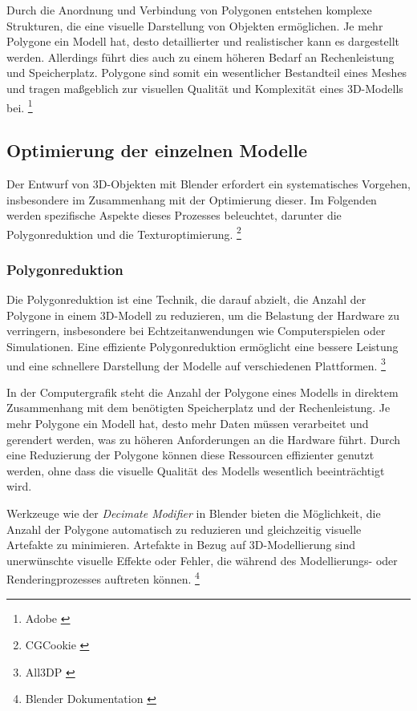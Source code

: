 Durch die Anordnung und Verbindung von Polygonen entstehen komplexe Strukturen, die eine visuelle Darstellung von Objekten ermöglichen. Je mehr Polygone ein Modell hat, desto detaillierter und realistischer kann es dargestellt werden. Allerdings führt dies auch zu einem höheren Bedarf an Rechenleistung und Speicherplatz. Polygone sind somit ein wesentlicher Bestandteil eines Meshes und tragen maßgeblich zur visuellen Qualität und Komplexität eines 3D-Modells bei. \footnote{Adobe \cite{3D Polygon Modeling}}

\subsection{Optimierung der einzelnen Modelle}
Der Entwurf von 3D-Objekten mit Blender erfordert ein systematisches Vorgehen, insbesondere im Zusammenhang mit der Optimierung dieser. Im Folgenden werden spezifische Aspekte dieses Prozesses beleuchtet, darunter die Polygonreduktion und die Texturoptimierung. \footnote{CGCookie \cite{Ways to optimize Game Assets}}

\subsubsection{Polygonreduktion}
Die Polygonreduktion ist eine Technik, die darauf abzielt, die Anzahl der Polygone in einem 3D-Modell zu reduzieren, um die Belastung der Hardware zu verringern, insbesondere bei Echtzeitanwendungen wie Computerspielen oder Simulationen. Eine effiziente Polygonreduktion ermöglicht eine bessere Leistung und eine schnellere Darstellung der Modelle auf verschiedenen Plattformen. \footnote{All3DP \cite{How to reduce Polygons}}


In der Computergrafik steht die Anzahl der Polygone eines Modells in direktem Zusammenhang mit dem benötigten Speicherplatz und der Rechenleistung. Je mehr Polygone ein Modell hat, desto mehr Daten müssen verarbeitet und gerendert werden, was zu höheren Anforderungen an die Hardware führt. Durch eine Reduzierung der Polygone können diese Ressourcen effizienter genutzt werden, ohne dass die visuelle Qualität des Modells wesentlich beeinträchtigt wird.

Werkzeuge wie der \textit{Decimate Modifier} in Blender bieten die Möglichkeit, die Anzahl der Polygone automatisch zu reduzieren und gleichzeitig visuelle Artefakte zu minimieren. Artefakte in Bezug auf 3D-Modellierung sind unerwünschte visuelle Effekte oder Fehler, die während des Modellierungs- oder Renderingprozesses auftreten können. \footnote{Blender Dokumentation \cite {Decimate Modifier}}

